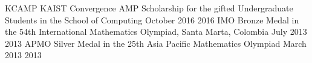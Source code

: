 \begin{cvhonors}
  \cvhonor
    {KCAMP}
    {KAIST Convergence AMP Scholarship for the gifted Undergraduate Students in the School of Computing}
    {October 2016}
    {2016}
  \cvhonor
    {IMO}
    {Bronze Medal in the 54th International Mathematics Olympiad, Santa Marta, Colombia}
    {July 2013}
    {2013}
  \cvhonor
  {APMO}
  {Silver Medal in the 25th Asia Pacific Mathematics Olympiad}
  {March 2013}
  {2013}
\end{cvhonors}
